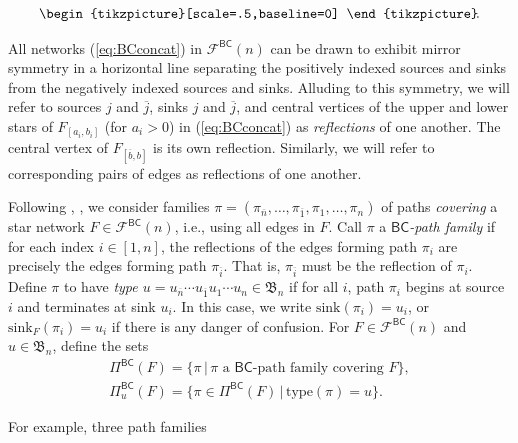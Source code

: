 \documentclass[12pt]{amsart}
\theoremstyle{definition}
\numberwithin{equation}{section}
\newcommand{\bn}{\mathfrak{B}_n}
\newcommand{\ol}[1]{\overline{#1}}
\newcommand{\snk}{\mathrm{sink}}
\newcommand{\type}{\mathrm{type}}
\newcommand{\ntnsp}{\negthinspace}
\newcommand{\PiBC}{\Pi^{\msfBC}}
\newcommand{\net}[2]{\mathcal F^{\mathsf{#1}}(#2)}
\newcommand{\msfBC}{\mathsf{BC}}
\begin{document}
\begin{equation}
\begin{tikzpicture}[scale=.5,baseline=0]
\end{tikzpicture}\ntnsp. 
\end{equation}


All networks (\ref{eq:BCconcat}) in $\net{BC}n$ can be drawn to exhibit mirror symmetry in a horizontal line separating the positively indexed sources and sinks from the negatively indexed sources and sinks. Alluding to this symmetry, we will refer to sources $j$ and $\ol j$, sinks $j$ and $\ol j$, and central vertices of the upper and lower stars of $F_{[a_i,b_i]}$ (for $a_i > 0$) in (\ref{eq:BCconcat}) as {\em reflections} of one another.  The central vertex of $F_{[\ol b, b]}$ is its own reflection. Similarly, we will refer to corresponding pairs of edges as reflections of one another.


Following \cite{BWHex}, \cite{CSkanTNNChar}, we
consider families
$\pi=(\pi_{\ol n}, \dotsc, \pi_{\ol 1}, \pi_1, \dotsc, \pi_n)$
of paths {\em covering} a star network $F \in \net{BC}n$, i.e., using all edges in $F$. Call $\pi$ a {\em $\msfBC$-path family} if
for each index $i \in [1,n]$, 
the reflections of the edges forming path $\pi_{i}$ are precisely the edges forming path $\pi_{\ol i}$. That is, $\pi_{\ol i}$ must be the reflection of $\pi_i$.
Define $\pi$ to have {\em type $u = u_{\ol n} \cdots u_{\ol 1} u_1 \cdots u_n \in \bn$} if for all $i$, path $\pi_i$ begins at source $i$ and terminates at sink $u_i$.  In this case, we write $\snk(\pi_i) = u_i$, or $\snk_F(\pi_i) = u_i$ if there is any danger of confusion. For $F \in \net{BC}n$ and $u \in \bn$, define the sets
\begin{equation}\label{eq:BCpathfams}
  \begin{gathered}
    \PiBC(F) = \{ \pi \,|\, \pi \text{ a $\msfBC$-path family covering } F \},\\
    \PiBC_u(F) = \{ \pi \in \PiBC(F) \,|\, \type(\pi) = u \}.
    \end{gathered}
\end{equation}

For example, three path families 
\end{document}
